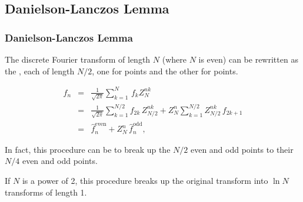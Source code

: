 \documentclass[hyperref={colorlinks=true}]{beamer}
\begin{document}
\subsection[Danielson-Lanczos Lemma]{Danielson-Lanczos Lemma}
  
\begin{frame}%
  \frametitle{Danielson-Lanczos Lemma}
  
  The discrete Fourier transform of length $N$ (where $N$ is even) can be rewritten as the , each of length $N/2$, one for  points and the other for  points. 
      
  \begin{eqnarray}
    \hat{f}_n	&=&	\frac{1}{\sqrt{2\pi}} \sum_{k=1}^{N} \, f_k  Z_{N}^{nk}	\\
	            &=& \frac{1}{\sqrt{2\pi}} \sum_{k=1}^{N/2} f_{2k} \,  Z_{N/2}^{nk} + Z_N^n \sum_{k=1}^{N/2} Z_{N/2}^{nk} \, f_{2k+1}	\\
	            &=& \hat{f}_n^{\mathrm{even}} + Z_N^n \, \hat{f}_n^{\mathrm{odd}},	
  \end{eqnarray}

  In fact, this procedure can be  to break up the $N/2$ even and odd points to their $N/4$ even and odd points. 
  
  \mysp
  
  If $N$ is a power of 2, this procedure breaks up the original transform into $\ln N$ transforms of length 1.
  
\end{frame}  
  
\end{document}
